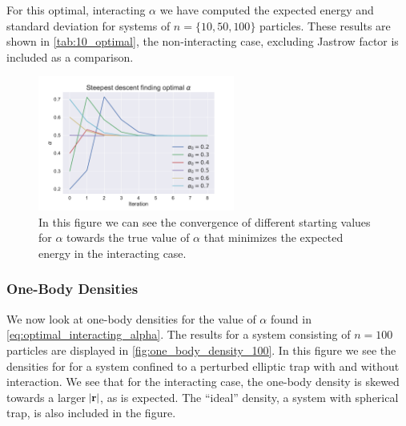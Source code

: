 \documentclass[
    a4paper, aps, twocolumn, floatfix, superscriptaddress,
    nofootinbib]{revtex4-1}
\newcommand{\vf}{\mathbf}
\newcommand{\1}{\mathds{1}}
\begin{document}
            For this optimal, interacting $\alpha$ we have computed the expected
            energy and standard deviation for systems of $n = \{10, 50, 100\}$
            particles. These results are shown in \autoref{tab:10_optimal}, the
            non-interacting case, excluding Jastrow factor is included as a
            comparison.

            \begin{figure}
                \includegraphics[width=244px]{../data/figures/problem_f.pdf}
                \caption{In this figure we can see the convergence of different
                starting values for $\alpha$ towards the true value of $\alpha$
                that minimizes the expected energy in the interacting case.}
                \label{fig:gradient_descent_interacting}
            \end{figure}

        \subsubsection{One-Body Densities}
            We now look at one-body densities for the value of $\alpha$ found in
            \autoref{eq:optimal_interacting_alpha}. The results for a system consisting
            of $n=100$ particles are displayed in \autoref{fig:one_body_density_100}.
            In this figure we see the densities for for a system confined to a
            perturbed elliptic trap with and without interaction. We see that for the
            interacting case, the one-body density is skewed towards a larger
            $\abs{\vf{r}}$, as is expected. The ``ideal'' density, a system with spherical
            trap, is also included in the figure.
\end{document}
